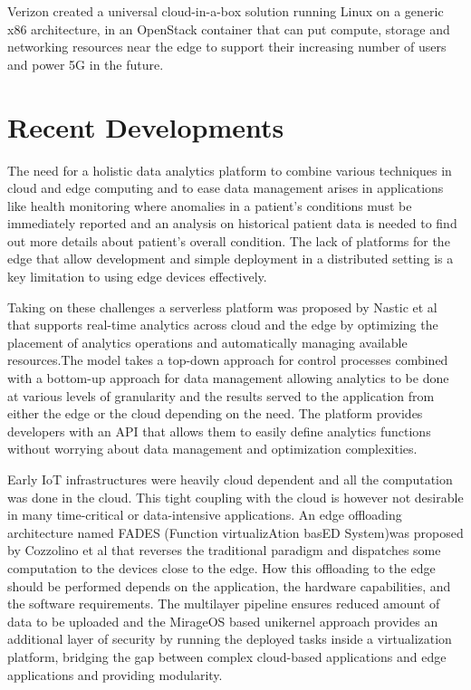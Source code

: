 \documentclass[sigconf]{acmart}
\begin{document}
Verizon created a universal cloud-in-a-box solution running Linux on a generic x86 architecture, in an OpenStack container that can put compute, storage and networking resources near the edge to support their increasing number of users and power 5G in the future\cite{open_stack_living_on_edge}\cite{open_stack_verizon}.

\section{Recent Developments}
The need for a holistic data analytics platform to combine various techniques in cloud and edge computing and to ease data management arises in applications like health monitoring where anomalies in a patient's conditions must be immediately reported and an analysis on historical patient data is needed to find out more details about patient's overall condition\cite{ieee-serverless-platform-edge}. The lack of platforms for the edge that allow development and simple deployment in a distributed setting is a key limitation to using edge devices effectively\cite{ieee_iot_cloud_analytics_newsletter}.

Taking on these challenges a serverless platform was proposed by Nastic et al that supports real-time analytics across cloud and the edge by optimizing the placement of analytics operations and automatically managing available resources\cite{ieee-serverless-platform-edge}.The model takes a top-down approach for control processes combined with a bottom-up approach for data management allowing analytics to be done at various levels of granularity and the results served to the application from either the edge or the cloud depending on the need\cite{ieee-serverless-platform-edge}. The platform provides developers with an API that allows them to easily define analytics functions without worrying about data management and optimization complexities. 

Early IoT infrastructures were heavily cloud dependent and all the computation was done in the cloud. This tight coupling with the cloud is however not  desirable in many time-critical or data-intensive applications\cite{FADES-offloading}. An edge offloading architecture named FADES (Function virtualizAtion basED System)was proposed by Cozzolino et al that reverses the traditional paradigm and dispatches some computation to the devices close to the edge. How this offloading to the edge should be performed depends on the application, the hardware capabilities, and the software requirements\cite{FADES-offloading}. The multilayer pipeline ensures reduced amount of data to be uploaded and the MirageOS based unikernel approach provides an additional layer of security by running the deployed tasks inside a virtualization platform, bridging the gap between complex cloud-based applications and edge applications and providing modularity\cite{FADES-offloading}.
\end{document}
